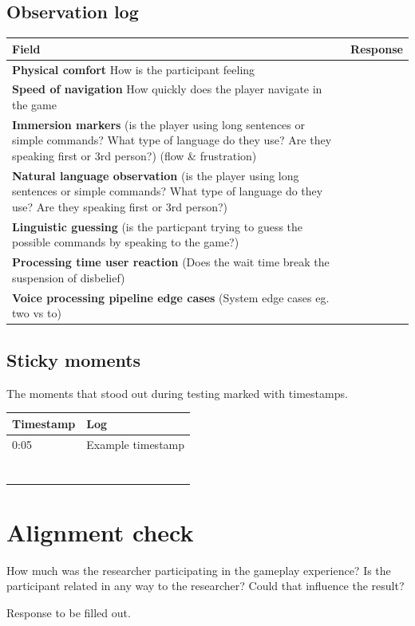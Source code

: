 \subsection{Observation log}
\begin{table}[H]
\centering
\begin{tabular}{|p{5cm}|p{10cm}|}
\hline
\textbf{Field} & \textbf{Response} \\ \hline
\textbf{Physical comfort} How is the participant feeling & \\[1.5cm] \hline
\textbf{Speed of navigation} How quickly does the player navigate in the game & \\[1.5cm] \hline
\textbf{Immersion markers} (is the player using long sentences or simple commands? What type of language do they use? Are they speaking first or 3rd person?) (flow \& frustration) & \\[1.5cm] \hline
\textbf{Natural language observation} (is the player using long sentences or simple commands? What type of language do they use? Are they speaking first or 3rd person?) & \\[1.5cm] \hline
\textbf{Linguistic guessing} (is the particpant trying to guess the possible commands by speaking to the game?) & \\[1.5cm] \hline
\textbf{Processing time user reaction} (Does the wait time break the suspension of disbelief)& \\[1.5cm] \hline
\textbf{Voice processing pipeline edge cases} (System edge cases eg. two vs to)& \\[1.5cm] \hline
\end{tabular}
\end{table}

\subsection{Sticky moments}
The moments that stood out during testing marked with timestamps.
\begin{table}[h]
\centering
\begin{tabular}{|p{3cm}|p{10cm}|}
\hline
\textbf{Timestamp} & \textbf{Log} \\ \hline
0:05 & Example timestamp \\ \hline 
 &  \\ \hline 
 &  \\ \hline 
 &  \\ \hline 
 &  \\ \hline 
 &  \\ \hline 
 &  \\ \hline 
 &  \\ \hline 

\end{tabular}
\end{table}

\section{Alignment check}
How much was the researcher participating in the gameplay experience? 
Is the participant related in any way to the researcher? Could that influence the result?

Response to be filled out.
